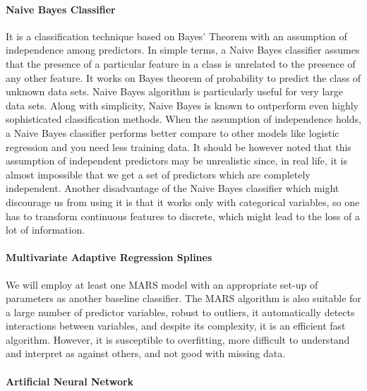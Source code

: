 \documentclass[
  10pt,
]{article}
\begin{document}
\hypertarget{naive-bayes-classifier}{%
\paragraph{\texorpdfstring{Naive Bayes Classifier }{Naive Bayes Classifier  }}\label{naive-bayes-classifier}}

It is a classification technique based on Bayes' Theorem with an assumption of independence among predictors. In simple terms, a Naive Bayes classifier assumes that the presence of a particular feature in a class is unrelated to the presence of any other feature. It works on Bayes theorem of probability to predict the class of unknown data sets. Naive Bayes algorithm is particularly useful for very large data sets. Along with simplicity, Naive Bayes is known to outperform even highly sophisticated classification methods. When the assumption of independence holds, a Naive Bayes classifier performs better compare to other models like logistic regression and you need less training data. It should be however noted that this assumption of independent predictors may be unrealistic since, in real life, it is almost impossible that we get a set of predictors which are completely independent. Another disadvantage of the Naive Bayes classifier which might discourage us from using it is that it works only with categorical variables, so one has to transform continuous features to discrete, which might lead to the loss of a lot of information.

\hypertarget{multivariate-adaptive-regression-splines}{%
\paragraph{Multivariate Adaptive Regression Splines}\label{multivariate-adaptive-regression-splines}}

We will employ at least one MARS model with an appropriate set-up of parameters as another baseline classifier. The MARS algorithm is also suitable for a large number of predictor variables, robust to outliers, it automatically detects interactions between variables, and despite its complexity, it is an efficient fast algorithm. However, it is susceptible to overfitting, more difficult to understand and interpret as against others, and not good with missing data.

\hypertarget{artificial-neural-network}{%
\paragraph{Artificial Neural Network}\label{artificial-neural-network}}
\end{document}
